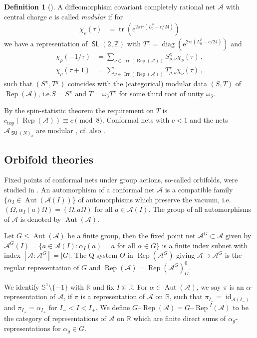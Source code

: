\documentclass[twoside,11pt,reqno]{amsart}
\makeatletter
\theoremstyle{definition}
\newtheorem{defi}[thm]{Definition}
\theoremstyle{remark}
\newcommand{\SL}{\mathop{\mathsf{SL}}}
\newcommand{\SU}{\mathop{\mathsf{SU}}}
\newcommand{\Sc}[1][]{\mathbb{S}^{1#1}}
\newcommand{\A}{\mathcal{A}}
\newcommand{\RR}{\mathbb{R}}
\newcommand{\ZZ}{\mathbb{Z}}
\DeclareMathOperator{\Rep}{Rep}
\DeclareMathOperator{\diag}{diag}
\DeclareMathOperator{\id}{id}
\DeclareMathOperator{\tr}{tr}
\DeclareMathOperator{\Aut}{Aut}
\newcommand{\e}{\mathrm{e}}
\newcommand{\ima}{\mathrm{i}}
\DeclareRobustCommand{\cf}{cf.\@\xspace}
\DeclareRobustCommand{\ie}{i.e.\@\xspace}
\DeclareMathOperator{\Irr}{Irr}
\newcommand{\tRep}[1]{#1\text{--}\Rep}
\newcommand{\myemph}[1]{\emph{#1}}
\makeatother
\begin{document}
\begin{defi}[\cite{KaLo2005}]
  \label{defi:ModularNet}
  A diffeomorphism covariant completely rational net $\A$ with central charge 
  $c$ is called \myemph{modular} if for 
  \begin{align}
    \chi_\rho(\tau)&=\tr\left(\e^{2\pi\ima\tau (L^\rho_0-c/24)}\right)
  \end{align}
  we have a  representation of $\SL(2,\ZZ)$ with 
  $T^\chi=\diag( \e^{2\pi\ima (L^\rho_0-c/24)})$ and
%
  \begin{align}
    \chi_\rho(-1/\tau)
      &=\sum_{\nu\in\Irr(\Rep(\A))} S^\chi_{\rho,\nu}\chi_\nu(\tau)\,,\\
    \chi_\rho(\tau+1)
      &=\sum_{\nu\in\Irr(\Rep(\A))} T^\chi_{\rho,\nu}\chi_\nu(\tau)\,,
  \end{align}
  such that $(S^\chi,T^\chi)$ coincides with the (categorical) modular data 
  $(S,T)$ of $\Rep(\A)$, 
  \ie $S=S^\chi$ and $T=\omega_3 T^\chi$ for some third root of unity 
  $\omega_3$.
\end{defi}
By the spin-statistic theorem \cite{GuLo1995} the requirement on $T$ is $c_\mathrm{top}(\Rep(\A))\equiv c\pmod 8$.
Conformal nets with $c<1$ and the nets $\A_{\SU(N)_k}$ are modular 
\cite{Xu2000,Xu2001}, \cf also \cite{KaLo2005}.

\subsection{Orbifold theories}
Fixed points of conformal nets under group actions, so-called orbifolds, 
were studied in \cite{Xu2000-2,Mg2005}.
An automorphism of a conformal net $\A$ is a compatible family 
$\{\alpha_I\in\Aut(\A(I))\}$ of automorphisms which preserve the vacuum, 
\ie $(\Omega,\alpha_I(a)\Omega)= (\Omega,a\Omega)$ for all $a\in\A(I)$. 
The group of all automorphisms of $\A$ is denoted by $\Aut(\A)$.

Let $G\leq \Aut(\A)$ be a finite group, then the fixed point net 
$\A^G\subset \A$ given by
$\A^G(I)=\{a\in\A(I):\alpha_I(a)=a \text{ for all }\alpha\in G\}$ 
is a finite index subnet with index $[\A :\A^G]=|G|$. 
The Q-system $\Theta$ in $\Rep(\A^G)$ giving $\A\supset \A^G$ is the regular 
representation of $G$ and $\Rep(\A)=\Rep(\A^G)_G^0$.

We identify $\Sc\setminus\{-1\}$ with $\RR$ and fix $I\Subset \RR$.
For $\alpha\in \Aut(\A)$, we say $\pi$ is an $\alpha$-representation
of $\A$, if $\pi$ is a representation of $\A$ on $\RR$, 
such that $\pi_{I_-}=\id_{\A(I_-)}$ and $\pi_{I_+}=\alpha_{I_+}$
for $I_-<I<I_+$.
We define ${\tRep G}(\A)={\tRep G}^I(\A)$ to be the category of 
representations of $\A$ on $\RR$ which are finite direct sums  
of $\alpha_g$-representations for $\alpha_g\in G$.
\end{document}
